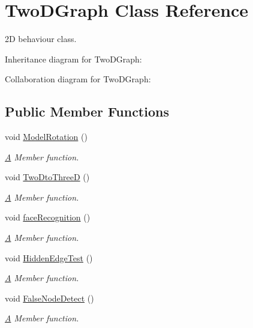 \hypertarget{classTwoDGraph}{}\section{Two\+D\+Graph Class Reference}
\label{classTwoDGraph}


2D behaviour class.  




Inheritance diagram for Two\+D\+Graph\+:


Collaboration diagram for Two\+D\+Graph\+:
\subsection*{Public Member Functions}
\begin{DoxyCompactItemize}
\item 
void \hyperlink{classTwoDGraph_a1eb77cb9e303bdcd28f985a1f3ca02b4}{Model\+Rotation} ()
\begin{DoxyCompactList}\small\item\em \hyperlink{classA}{A} Member function. \end{DoxyCompactList}\item 
void \hyperlink{classTwoDGraph_a54093bf95a87106de242cc8b8050243e}{Two\+Dto\+ThreeD} ()
\begin{DoxyCompactList}\small\item\em \hyperlink{classA}{A} Member function. \end{DoxyCompactList}\item 
void \hyperlink{classTwoDGraph_a7606c71011057d955db34a43e672ffd9}{face\+Recognition} ()
\begin{DoxyCompactList}\small\item\em \hyperlink{classA}{A} Member function. \end{DoxyCompactList}\item 
void \hyperlink{classTwoDGraph_af25742b8b2903fe231a7ccbbfbb48e08}{Hidden\+Edge\+Test} ()
\begin{DoxyCompactList}\small\item\em \hyperlink{classA}{A} Member function. \end{DoxyCompactList}\item 
void \hyperlink{classTwoDGraph_a48b9e1804733df394bd2bc2c78fec6aa}{False\+Node\+Detect} ()
\begin{DoxyCompactList}\small\item\em \hyperlink{classA}{A} Member function. \end{DoxyCompactList}\end{DoxyCompactItemize}
